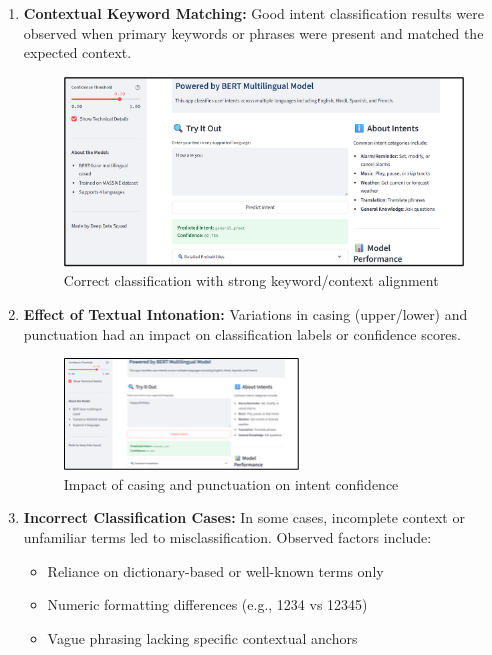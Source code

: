 \documentclass{ecai}
\begin{document}
\begin{enumerate}
    \item \textbf{Contextual Keyword Matching:} Good intent classification results were observed when primary keywords or phrases were present and matched the expected context.
    
    \begin{figure}[H]
    \centering
    \includegraphics[width=0.7\linewidth]{result1.png}
    \caption{Correct classification with strong keyword/context alignment}
    \end{figure}
    
    \item \textbf{Effect of Textual Intonation:} Variations in casing (upper/lower) and punctuation had an impact on classification labels or confidence scores.
    
    \begin{figure}[H]
    \centering
    \includegraphics[width=0.7\linewidth]{result2.png}
    \caption{Impact of casing and punctuation on intent confidence}
    \end{figure}
    
   
    
    \item \textbf{Incorrect Classification Cases:} In some cases, incomplete context or unfamiliar terms led to misclassification. Observed factors include:
    \begin{itemize}
        \item Reliance on dictionary-based or well-known terms only
        \item Numeric formatting differences (e.g., 1234 vs 12345)
        \item Vague phrasing lacking specific contextual anchors
    \end{itemize}
    

\end{enumerate}
\end{document}
